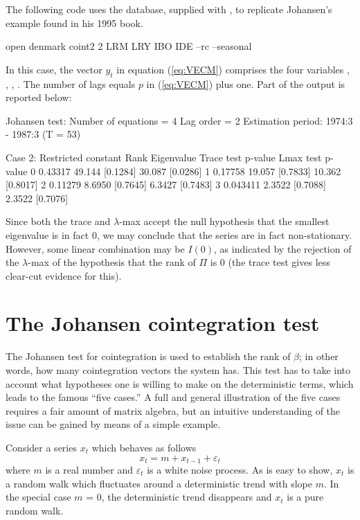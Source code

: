 The following code uses the  database, supplied with
, to replicate Johansen's example found in his 1995 book.
%
\begin{code}
open denmark
coint2 2 LRM LRY IBO IDE --rc --seasonal
\end{code}
%
In this case, the vector $y_t$ in equation (\ref{eq:VECM})
comprises the four variables , , ,
. The number of lags equals $p$ in (\ref{eq:VECM}) plus
one. Part of the output is reported below:

\begin{center}
\begin{code}
Johansen test:
Number of equations = 4
Lag order = 2
Estimation period: 1974:3 - 1987:3 (T = 53)

Case 2: Restricted constant
Rank Eigenvalue Trace test p-value   Lmax test  p-value
   0    0.43317     49.144 [0.1284]     30.087 [0.0286]
   1    0.17758     19.057 [0.7833]     10.362 [0.8017]
   2    0.11279     8.6950 [0.7645]     6.3427 [0.7483]
   3   0.043411     2.3522 [0.7088]     2.3522 [0.7076]
\end{code}
\end{center}

Since both the trace and $\lambda$-max accept the null hypothesis that
the smallest eigenvalue is in fact 0, we may conclude that the series
are in fact non-stationary. However, some linear combination may be
$I(0)$, as indicated by the rejection of the $\lambda$-max of the
hypothesis that the rank of $\Pi$ is 0 (the trace test gives less
clear-cut evidence for this).

\section{The Johansen cointegration test}
\label{sec:johansen-test}

The Johansen test for cointegration is used to establish the rank of
$\beta$; in other words, how many cointegration vectors the system
has.  This test has to take into account what hypotheses one is
willing to make on the deterministic terms, which leads to the famous
``five cases.'' A full and general illustration of the five cases
requires a fair amount of matrix algebra, but an intuitive
understanding of the issue can be gained by means of a simple example.
    
Consider a series $x_t$ which behaves as follows
%      
\[ x_t = m + x_{t-1} + \varepsilon_t \] 
%
where $m$ is a real number and $\varepsilon_t$ is a white noise
process. As is easy to show, $x_t$ is a random walk which fluctuates
around a deterministic trend with slope $m$. In the special case $m$ =
0, the deterministic trend disappears and $x_t$ is a pure random walk.
    
